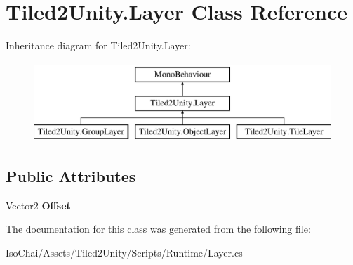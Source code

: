 \hypertarget{class_tiled2_unity_1_1_layer}{}\section{Tiled2\+Unity.\+Layer Class Reference}
\label{class_tiled2_unity_1_1_layer}
Inheritance diagram for Tiled2\+Unity.\+Layer\+:\begin{figure}[H]
\begin{center}
\leavevmode
\includegraphics[height=3.000000cm]{class_tiled2_unity_1_1_layer}
\end{center}
\end{figure}
\subsection*{Public Attributes}
\begin{DoxyCompactItemize}
\item 
\mbox{\label{class_tiled2_unity_1_1_layer_a59ea769705fb72a22ad0185d086001df}} 
Vector2 {\bfseries Offset}
\end{DoxyCompactItemize}


The documentation for this class was generated from the following file\+:\begin{DoxyCompactItemize}
\item 
Iso\+Chai/\+Assets/\+Tiled2\+Unity/\+Scripts/\+Runtime/Layer.\+cs\end{DoxyCompactItemize}
